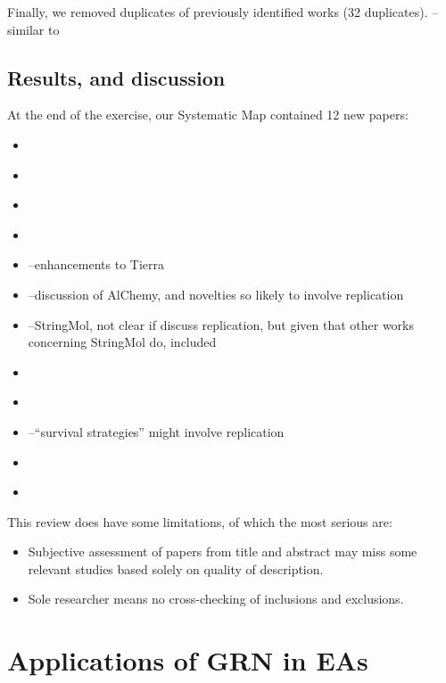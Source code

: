 
Finally, we removed duplicates of previously identified works (32 duplicates).
\eg \cite{smFaulconbridgeStepneyMillerEtAl2011}--similar to \cite{Faulconbridge2011, Faulconbridge2010}

\section{Results, and discussion}

At the end of the exercise, our Systematic Map contained 12 new papers:
\begin{itemize}
\item \cite{smAdamsLipson2003}
\item \cite{smBobrikKvasnickaPospichal2008a}
\item \cite{smBobrikKvasnickaPospichal2008}
\item \cite{smEllabaan2007}
\item \cite{smSugiuraSuzukiShioseEtAl2003}--enhancements to Tierra
\item \cite{smFenizioMatsumaruDittrich2011}--discussion of AlChemy, and novelties so likely to involve replication
\item \cite{smHickinbothamClarkNellisEtAl2016}--StringMol, not clear if discuss replication, but given that other works concerning StringMol do, included
\item \cite{smHinzeFaslerLenserEtAl2009}
\item \cite{smSuzuki2003a}
\item \cite{smBanzhafDittrichEller1999}--``survival strategies'' might involve replication
\item \cite{smGordon-Smith2011}
\item \cite{smGohEweGoh2014}
\end{itemize}

This review does have some limitations, of which the most serious are:
\begin{itemize}
	\item Subjective assessment of papers from title and abstract may miss some relevant studies based solely on quality of description.
	\item Sole researcher means no cross-checking of inclusions and exclusions.
\end{itemize}

\chapter{Applications of GRN in EAs}\label{applications-of-grn-in-eas}

